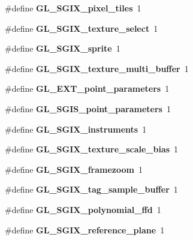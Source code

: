\begin{DoxyCompactItemize}
\item 
\#define {\bfseries G\+L\+\_\+\+S\+G\+I\+X\+\_\+pixel\+\_\+tiles}~1\label{_s_d_l__opengl_8h_a76393e896fa88bfac496ee335f00cfc0}

\item 
\#define {\bfseries G\+L\+\_\+\+S\+G\+I\+X\+\_\+texture\+\_\+select}~1\label{_s_d_l__opengl_8h_a33a5a60ad4b86f03452cdfde272fbacc}

\item 
\#define {\bfseries G\+L\+\_\+\+S\+G\+I\+X\+\_\+sprite}~1\label{_s_d_l__opengl_8h_a339eae36935891c84bf38b6c37ec5c8a}

\item 
\#define {\bfseries G\+L\+\_\+\+S\+G\+I\+X\+\_\+texture\+\_\+multi\+\_\+buffer}~1\label{_s_d_l__opengl_8h_a1a802672ec617abcc925a8f791f58f16}

\item 
\#define {\bfseries G\+L\+\_\+\+E\+X\+T\+\_\+point\+\_\+parameters}~1\label{_s_d_l__opengl_8h_abf4fa8180bd121eac57d9d7134ccd0d9}

\item 
\#define {\bfseries G\+L\+\_\+\+S\+G\+I\+S\+\_\+point\+\_\+parameters}~1\label{_s_d_l__opengl_8h_ab69782929d6726c76311d6b2eb5a272d}

\item 
\#define {\bfseries G\+L\+\_\+\+S\+G\+I\+X\+\_\+instruments}~1\label{_s_d_l__opengl_8h_a6c492545e68f89d1a655da2f25fc1a15}

\item 
\#define {\bfseries G\+L\+\_\+\+S\+G\+I\+X\+\_\+texture\+\_\+scale\+\_\+bias}~1\label{_s_d_l__opengl_8h_a6ab170067597f1fe8ee16649dc100452}

\item 
\#define {\bfseries G\+L\+\_\+\+S\+G\+I\+X\+\_\+framezoom}~1\label{_s_d_l__opengl_8h_aac6dcb4154be96f48131784261d4f3c1}

\item 
\#define {\bfseries G\+L\+\_\+\+S\+G\+I\+X\+\_\+tag\+\_\+sample\+\_\+buffer}~1\label{_s_d_l__opengl_8h_afe89cabd3343add1d340bed842ef255f}

\item 
\#define {\bfseries G\+L\+\_\+\+S\+G\+I\+X\+\_\+polynomial\+\_\+ffd}~1\label{_s_d_l__opengl_8h_a2a7432704a52d3aca037c4a909af923e}

\item 
\#define {\bfseries G\+L\+\_\+\+S\+G\+I\+X\+\_\+reference\+\_\+plane}~1\label{_s_d_l__opengl_8h_ac56c2443f339b2fb3615043ce8d4bc4e}


\end{DoxyCompactItemize}
